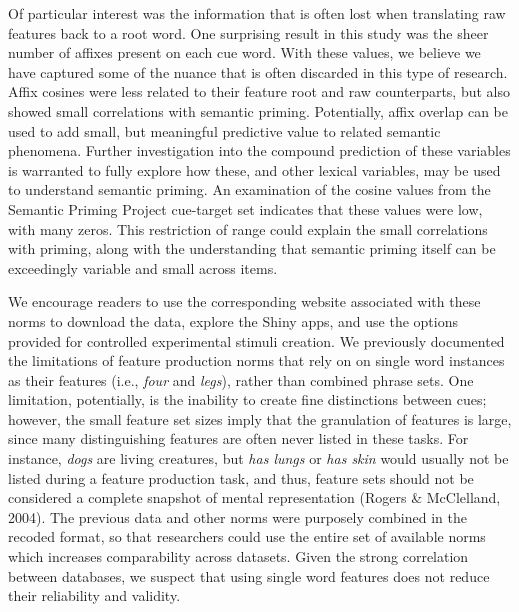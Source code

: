\documentclass[english,,man]{apa6}
\theoremstyle{definition}
\theoremstyle{definition}
\theoremstyle{definition}
\theoremstyle{remark}
\begin{document}
Of particular interest was the information that is often lost when
translating raw features back to a root word. One surprising result in
this study was the sheer number of affixes present on each cue word.
With these values, we believe we have captured some of the nuance that
is often discarded in this type of research. Affix cosines were less
related to their feature root and raw counterparts, but also showed
small correlations with semantic priming. Potentially, affix overlap can
be used to add small, but meaningful predictive value to related
semantic phenomena. Further investigation into the compound prediction
of these variables is warranted to fully explore how these, and other
lexical variables, may be used to understand semantic priming. An
examination of the cosine values from the Semantic Priming Project
cue-target set indicates that these values were low, with many zeros.
This restriction of range could explain the small correlations with
priming, along with the understanding that semantic priming itself can
be exceedingly variable and small across items.

We encourage readers to use the corresponding website associated with
these norms to download the data, explore the Shiny apps, and use the
options provided for controlled experimental stimuli creation. We
previously documented the limitations of feature production norms that
rely on on single word instances as their features (i.e., \emph{four}
and \emph{legs}), rather than combined phrase sets. One limitation,
potentially, is the inability to create fine distinctions between cues;
however, the small feature set sizes imply that the granulation of
features is large, since many distinguishing features are often never
listed in these tasks. For instance, \emph{dogs} are living creatures,
but \emph{has lungs} or \emph{has skin} would usually not be listed
during a feature production task, and thus, feature sets should not be
considered a complete snapshot of mental representation (Rogers \&
McClelland, 2004). The previous data and other norms were purposely
combined in the recoded format, so that researchers could use the entire
set of available norms which increases comparability across datasets.
Given the strong correlation between databases, we suspect that using
single word features does not reduce their reliability and validity.
\end{document}
